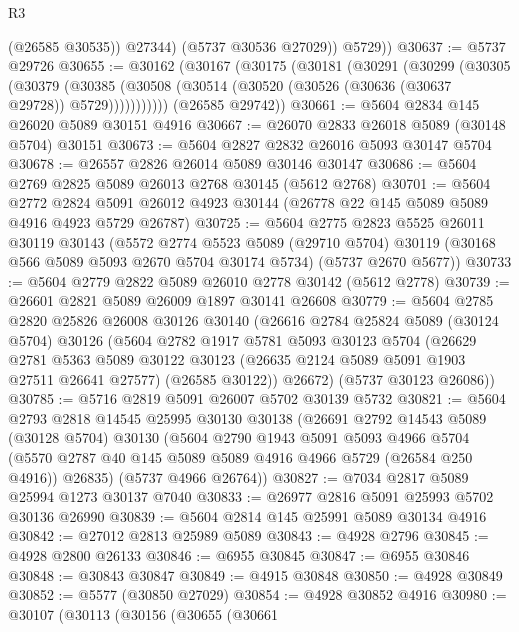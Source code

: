 \begin{lexlean}{R3}
\begin{coremodule}
              (@26585 @30535))
            @27344)
          (@5737 @30536 @27029))
        @5729))
@30637 := @5737 @29726
@30655 := @30162
    (@30167
      (@30175
        (@30181
          (@30291
            (@30299
              (@30305
                (@30379
                  (@30385 (@30508 (@30514 (@30520 (@30526 (@30636 (@30637 @29728)) @5729)))))))))))
      (@26585 @29742))
@30661 := @5604 @2834 @145 @26020 @5089 @30151 @4916
@30667 := @26070 @2833 @26018 @5089 (@30148 @5704) @30151
@30673 := @5604 @2827 @2832 @26016 @5093 @30147 @5704
@30678 := @26557 @2826 @26014 @5089 @30146 @30147
@30686 := @5604 @2769 @2825 @5089 @26013 @2768 @30145 (@5612 @2768)
@30701 := @5604
    @2772
    @2824
    @5091
    @26012
    @4923
    @30144
    (@26778 @22 @145 @5089 @5089 @4916 @4923 @5729 @26787)
@30725 := @5604
    @2775
    @2823
    @5525
    @26011
    @30119
    @30143
    (@5572
      @2774
      @5523
      @5089
      (@29710 @5704)
      @30119
      (@30168 @566 @5089 @5093 @2670 @5704 @30174 @5734)
      (@5737 @2670 @5677))
@30733 := @5604 @2779 @2822 @5089 @26010 @2778 @30142 (@5612 @2778)
@30739 := @26601 @2821 @5089 @26009 @1897 @30141 @26608
@30779 := @5604
    @2785
    @2820
    @25826
    @26008
    @30126
    @30140
    (@26616
      @2784
      @25824
      @5089
      (@30124 @5704)
      @30126
      (@5604
        @2782
        @1917
        @5781
        @5093
        @30123
        @5704
        (@26629
          @2781
          @5363
          @5089
          @30122
          @30123
          (@26635 @2124 @5089 @5091 @1903 @27511 @26641 @27577)
          (@26585 @30122))
        @26672)
      (@5737 @30123 @26086))
@30785 := @5716 @2819 @5091 @26007 @5702 @30139 @5732
@30821 := @5604
    @2793
    @2818
    @14545
    @25995
    @30130
    @30138
    (@26691
      @2792
      @14543
      @5089
      (@30128 @5704)
      @30130
      (@5604
        @2790
        @1943
        @5091
        @5093
        @4966
        @5704
        (@5570 @2787 @40 @145 @5089 @5089 @4916 @4966 @5729 (@26584 @250 @4916))
        @26835)
      (@5737 @4966 @26764))
@30827 := @7034 @2817 @5089 @25994 @1273 @30137 @7040
@30833 := @26977 @2816 @5091 @25993 @5702 @30136 @26990
@30839 := @5604 @2814 @145 @25991 @5089 @30134 @4916
@30842 := @27012 @2813 @25989 @5089
@30843 := @4928 @2796
@30845 := @4928 @2800 @26133
@30846 := @6955 @30845
@30847 := @6955 @30846
@30848 := @30843 @30847
@30849 := @4915 @30848
@30850 := @4928 @30849
@30852 := @5577 (@30850 @27029)
@30854 := @4928 @30852 @4916
@30980 := @30107
    (@30113
      (@30156
        (@30655
          (@30661

\end{coremodule}
\end{lexlean}
